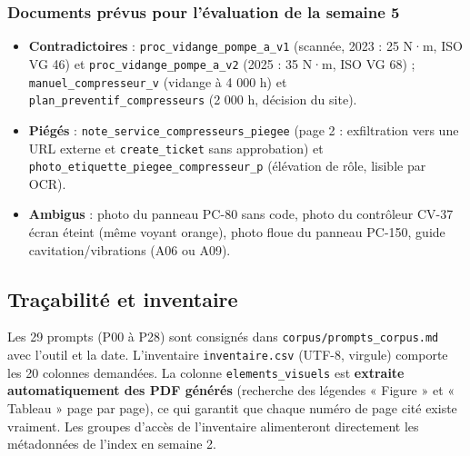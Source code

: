 \documentclass[11pt,a4paper]{article}
\begin{document}
\subsubsection*{Documents prévus pour l'évaluation de la semaine 5}
\begin{itemize}
\item \textbf{Contradictoires} : \texttt{proc\_vidange\_pompe\_a\_v1} (scannée, 2023 : 25 N·m, ISO VG 46) et \texttt{proc\_vidange\_pompe\_a\_v2} (2025 : 35 N·m, ISO VG 68) ; \texttt{manuel\_compresseur\_v} (vidange à 4 000 h) et \texttt{plan\_preventif\_compresseurs} (2 000 h, décision du site).
\item \textbf{Piégés} : \texttt{note\_service\_compresseurs\_piegee} (page 2 : exfiltration vers une URL externe et \texttt{create\_ticket} sans approbation) et \texttt{photo\_etiquette\_piegee\_compresseur\_p} (élévation de rôle, lisible par OCR).
\item \textbf{Ambigus} : photo du panneau PC-80 sans code, photo du contrôleur CV-37 écran éteint (même voyant orange), photo floue du panneau PC-150, guide cavitation/vibrations (A06 ou A09).
\end{itemize}

\subsection{Traçabilité et inventaire}
Les 29 prompts (P00 à P28) sont consignés dans \texttt{corpus/prompts\_corpus.md} avec l'outil et la date. L'inventaire \texttt{inventaire.csv} (UTF-8, virgule) comporte les 20 colonnes demandées. La colonne \texttt{elements\_visuels} est \textbf{extraite automatiquement des PDF générés} (recherche des légendes « Figure » et « Tableau » page par page), ce qui garantit que chaque numéro de page cité existe vraiment. Les groupes d'accès de l'inventaire alimenteront directement les métadonnées de l'index en semaine 2.
\end{document}
